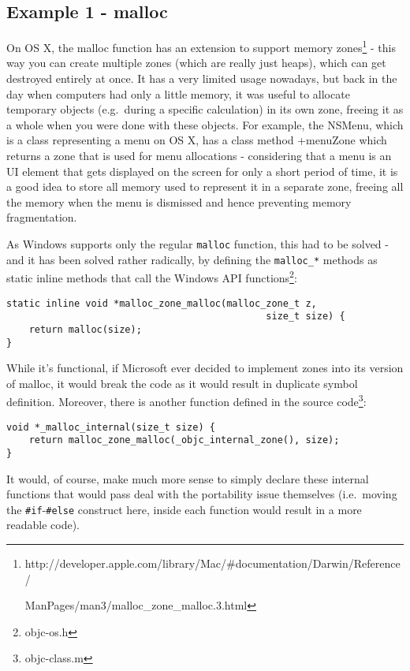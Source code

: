 \subsection{Example 1 - malloc}
On OS X, the malloc function has an extension to support memory zones\footnote{http://developer.apple.com/library/Mac/\#documentation/Darwin/Reference/

ManPages/man3/malloc\_zone\_malloc.3.html} - this way you can create multiple zones (which are really just heaps), which can get destroyed entirely at once. It has a very limited usage nowadays, but back in the day when computers had only a little memory, it was useful to allocate temporary objects (e.g.\ during a specific calculation) in its own zone, freeing it as a whole when you were done with these objects. For example, the NSMenu, which is a class representing a menu on OS X, has a class method +menuZone which returns a zone that is used for menu allocations - considering that a menu is an UI element that gets displayed on the screen for only a short period of time, it is a good idea to store all memory used to represent it in a separate zone, freeing all the memory when the menu is dismissed and hence preventing memory fragmentation.

As Windows supports only the regular \verb=malloc= function, this had to be solved - and it has been solved rather radically, by defining the \verb=malloc_*= methods as static inline methods that call the Windows API functions\footnote{objc-os.h}:

\begin{verbatim}
static inline void *malloc_zone_malloc(malloc_zone_t z, 
                                              size_t size) { 
    return malloc(size); 
}
\end{verbatim}

While it's functional, if Microsoft ever decided to implement zones into its version of malloc, it would break the code as it would result in duplicate symbol definition. Moreover, there is another function defined in the source code\footnote{objc-class.m}:

\begin{verbatim}
void *_malloc_internal(size_t size) {
    return malloc_zone_malloc(_objc_internal_zone(), size);
}
\end{verbatim}

It would, of course, make much more sense to simply declare these internal functions that would pass deal with the portability issue themselves (i.e.\ moving the \verb=#if=-\verb=#else= construct here, inside each function would result in a more readable code).

